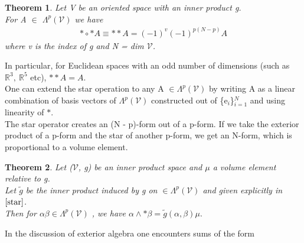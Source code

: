 \documentclass[12pt,a4paper]{article}
\newtheorem{thm}{Theorem}
\begin{document}
\begin{thm}
Let V be an oriented space with an inner product g.\\
For A $\in$ $\Lambda^{p}(\mathcal{V})$ we have
\begin{align*}
\ast \circ \ast A \equiv \ast \ast A = (-1)^v(-1)^{p(N-p)}A
\end{align*}
where v is the index of g and N = dim $\mathcal{V}$.
\end{thm}
In particular, for Euclidean spaces with an odd number of dimensions
(such as $\mathbb{R}^3, \ \mathbb{R}^5$ etc), $\ast \ast A = A.$\\
One can extend the star operation to any A $\in \Lambda^{p}(\mathcal{V})$ by writing A as a linear combination of basis vectors of $\Lambda^{p}(\mathcal{V})$ constructed out of 
\{e$_i$\}$^N_{i=1}$ and using linearity of $\ast$.\\
The star operator creates an (N - p)-form out of a p-form. If we take
the exterior product of a p-form and the star of another p-form, we get an
N-form, which is proportional to a volume element.
\begin{thm}
Let ($\mathcal{V}$, g) be an inner product space and $\mu$ a volume element relative to g. \\Let $\widetilde{g}$ be the inner product induced by g on $\in \Lambda^{p}(\mathcal{V})$  and given explicitly in $\ref{star}$. \\Then for $\alpha \beta \in \Lambda^{p}(\mathcal{V})$ , we have $\alpha \wedge \ast \beta = \widetilde{g}(\alpha, \beta) \mu.$
\end{thm}
In the discussion of exterior algebra one encounters sums of the form
\end{document}

